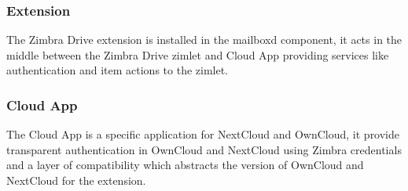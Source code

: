        \subsubsection{Extension}
        The Zimbra Drive extension is installed in the mailboxd component, it acts in the middle between the Zimbra
        Drive zimlet and Cloud App providing services like authentication and item actions to the zimlet.

        \subsubsection{Cloud App}
        The Cloud App is a specific application for NextCloud and OwnCloud, it provide transparent authentication in
        OwnCloud and NextCloud using Zimbra credentials and a layer of compatibility which abstracts the version of
        OwnCloud and NextCloud for the extension.
